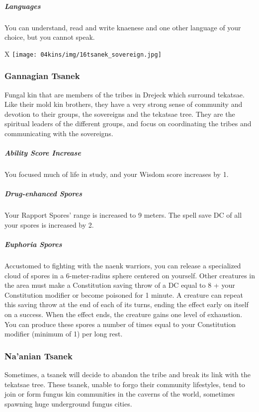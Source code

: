     \subparagraph{Languages} You can understand, read and write knaenese and one other language of your choice, but you cannot speak.

\begin{table*}[b]%
    \begin{DndTable}[width=\linewidth]{X}
        \texttt{[image: 04kins/img/16tsanek\_sovereign.jpg]}
    \end{DndTable}
\end{table*}

\subsubsection{Gannagian Tsanek}
    Fungal kin that are members of the tribes in Drejeck which surround tekatsae.
    Like their mold kin brothers, they have a very strong sense of community and devotion to their groups, the sovereigns and the tekatsae tree.
    They are the spiritual leaders of the different groups, and focus on coordinating the tribes and communicating with the sovereigns.

    \subparagraph{Ability Score Increase} You focused much of life in study, and your Wisdom score increases by 1.

    \subparagraph{Drug-enhanced Spores} Your Rapport Spores' range is increased to 9 meters.
    The spell save DC of all your spores is increased by 2.

    \subparagraph{Euphoria Spores} Accustomed to fighting with the naenk warriors, you can release a specialized cloud of spores in a 6-meter-radius sphere centered on yourself.
    Other creatures in the area must make a Constitution saving throw of a DC equal to 8 + your Constitution modifier or become poisoned for 1 minute.
    A creature can repeat this saving throw at the end of each of its turns, ending the effect early on itself on a success.
    When the effect ends, the creature gains one level of exhaustion.
    You can produce these spores a number of times equal to your Constitution modifier (minimum of 1) per long rest.

\subsubsection{Na'anian Tsanek}
    Sometimes, a tsanek will decide to abandon the tribe and break its link with the tekatsae tree.
    These tsanek, unable to forgo their community lifestyles, tend to join or form fungus kin communities in the caverns of the world, sometimes spawning huge underground fungus cities.

